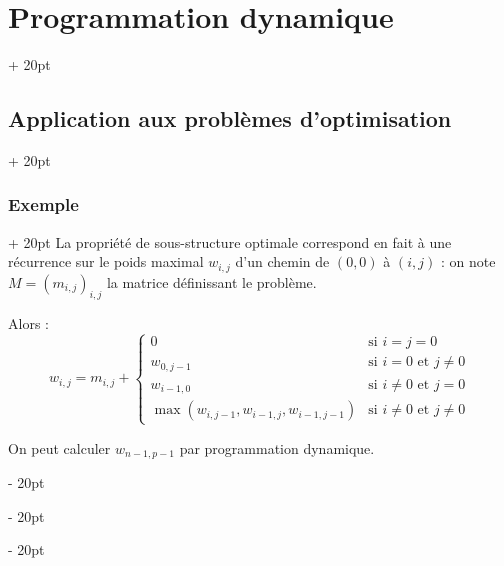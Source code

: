\documentclass[a4paper, 12pt, twoside]{article}
\newcommand{\ind}[1][20pt]{\advance\leftskip + #1}
\newcommand{\deind}[1][20pt]{\advance\leftskip - #1}
\newenvironment{indt}[2][20pt]{#2 \par \ind[#1]}{\par \deind} %
\begin{document}
\begin{indt}{\section{Programmation dynamique}}
\begin{indt}{\subsection{Application aux problèmes d'optimisation}}
\begin{indt}{\subsubsection{Exemple}}
                La propriété de sous-structure optimale correspond en fait à une récurrence sur le poids maximal $w_{i, j}$ d'un chemin de $(0, 0)$ à $(i ,j)$ : on note $M = (m_{i, j})_{i, j}$ la matrice définissant le problème.
                
                Alors :
                    \[
                        w_{i, j} = m_{i, j} +
                        \left\{
                        \begin{array}{ll}
                            0
                            & \text{si $i = j = 0$}
                            \\
                            w_{0, j - 1}
                            & \text{si $i = 0$ et $j \neq 0$}
                            \\
                            w_{i - 1, 0}
                            & \text{si $i \neq 0$ et $j = 0$}
                            \\
                            \max(w_{i, j - 1}, w_{i - 1, j}, w_{i - 1, j - 1})
                            & \text{si $i \neq 0$ et $j \neq 0$}
                        \end{array}
                        \right.
                    \]
                
                On peut calculer $w_{n - 1, p - 1}$ par programmation dynamique.
                

\end{indt}
\end{indt}
\end{indt}
\end{document}
